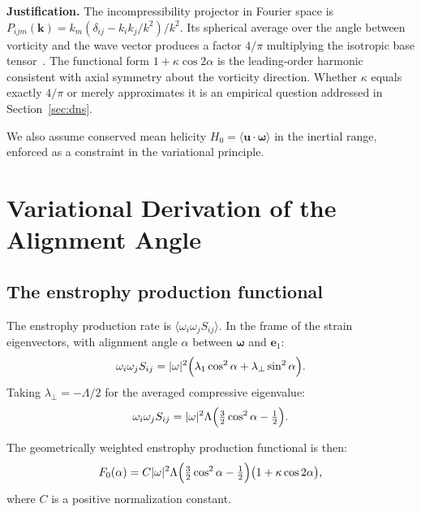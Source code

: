 \documentclass[12pt,a4paper]{article}
\begin{document}
\noindent\textbf{Justification.}
The incompressibility projector in Fourier space is $P_{ijm}(\bm{k}) = k_m(\delta_{ij} - k_i k_j / k^2)/k^2$.
Its spherical average over the angle between vorticity and the wave vector produces a factor $4/\pi$ multiplying the isotropic base tensor~\cite{McComb1990,Yakhot1986}.
The functional form $1 + \kappa\cos 2\alpha$ is the leading-order harmonic consistent with axial symmetry about the vorticity direction.
Whether $\kappa$ equals exactly $4/\pi$ or merely approximates it is an empirical question addressed in Section~\ref{sec:dns}.

We also assume conserved mean helicity $H_0 = \langle\bm{u}\cdot\bm{\omega}\rangle$ in the inertial range, enforced as a constraint in the variational principle.

\section{Variational Derivation of the Alignment Angle}
\label{sec:variational}

\subsection{The enstrophy production functional}

The enstrophy production rate is $\langle\omega_i\omega_j S_{ij}\rangle$.
In the frame of the strain eigenvectors, with alignment angle $\alpha$ between $\bm{\omega}$ and $\bm{e}_1$:
\begin{equation}
\omega_i \omega_j S_{ij} = |\omega|^2\Bigl(\lambda_1 \cos^2\alpha + \lambda_\perp \sin^2\alpha\Bigr).
\end{equation}
Taking $\lambda_\perp = -\Lambda/2$ for the averaged compressive eigenvalue:
\begin{equation}
\omega_i \omega_j S_{ij} = |\omega|^2\Lambda\Bigl(\tfrac{3}{2}\cos^2\alpha - \tfrac{1}{2}\Bigr).
\end{equation}

The geometrically weighted enstrophy production functional is then:
\begin{equation}
\label{eq:F0}
F_0(\alpha) = C|\omega|^2\Lambda\Bigl(\tfrac{3}{2}\cos^2\alpha - \tfrac{1}{2}\Bigr)\bigl(1 + \kappa\cos 2\alpha\bigr),
\end{equation}
where $C$ is a positive normalization constant.
\end{document}
